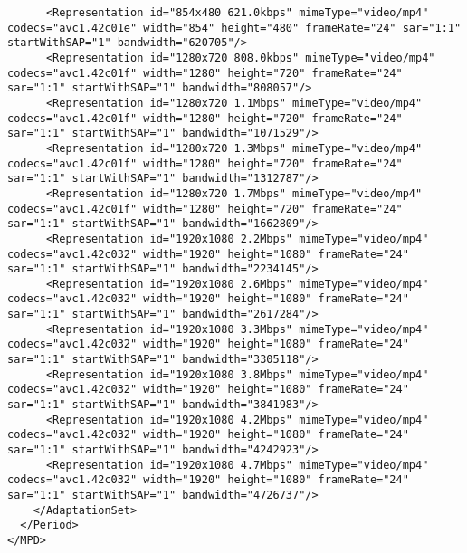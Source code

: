 \begin{lstlisting}
      <Representation id="854x480 621.0kbps" mimeType="video/mp4" codecs="avc1.42c01e" width="854" height="480" frameRate="24" sar="1:1" startWithSAP="1" bandwidth="620705"/>
      <Representation id="1280x720 808.0kbps" mimeType="video/mp4" codecs="avc1.42c01f" width="1280" height="720" frameRate="24" sar="1:1" startWithSAP="1" bandwidth="808057"/>
      <Representation id="1280x720 1.1Mbps" mimeType="video/mp4" codecs="avc1.42c01f" width="1280" height="720" frameRate="24" sar="1:1" startWithSAP="1" bandwidth="1071529"/>
      <Representation id="1280x720 1.3Mbps" mimeType="video/mp4" codecs="avc1.42c01f" width="1280" height="720" frameRate="24" sar="1:1" startWithSAP="1" bandwidth="1312787"/>
      <Representation id="1280x720 1.7Mbps" mimeType="video/mp4" codecs="avc1.42c01f" width="1280" height="720" frameRate="24" sar="1:1" startWithSAP="1" bandwidth="1662809"/>
      <Representation id="1920x1080 2.2Mbps" mimeType="video/mp4" codecs="avc1.42c032" width="1920" height="1080" frameRate="24" sar="1:1" startWithSAP="1" bandwidth="2234145"/>
      <Representation id="1920x1080 2.6Mbps" mimeType="video/mp4" codecs="avc1.42c032" width="1920" height="1080" frameRate="24" sar="1:1" startWithSAP="1" bandwidth="2617284"/>
      <Representation id="1920x1080 3.3Mbps" mimeType="video/mp4" codecs="avc1.42c032" width="1920" height="1080" frameRate="24" sar="1:1" startWithSAP="1" bandwidth="3305118"/>
      <Representation id="1920x1080 3.8Mbps" mimeType="video/mp4" codecs="avc1.42c032" width="1920" height="1080" frameRate="24" sar="1:1" startWithSAP="1" bandwidth="3841983"/>
      <Representation id="1920x1080 4.2Mbps" mimeType="video/mp4" codecs="avc1.42c032" width="1920" height="1080" frameRate="24" sar="1:1" startWithSAP="1" bandwidth="4242923"/>
      <Representation id="1920x1080 4.7Mbps" mimeType="video/mp4" codecs="avc1.42c032" width="1920" height="1080" frameRate="24" sar="1:1" startWithSAP="1" bandwidth="4726737"/>
    </AdaptationSet>
  </Period>
</MPD>
\end{lstlisting}


